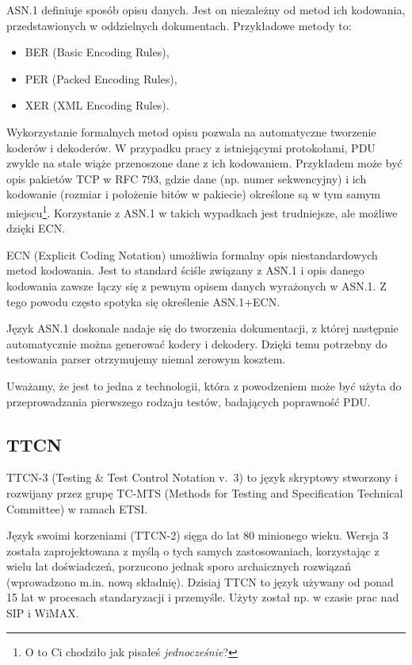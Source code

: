 \documentclass[00-praca-magisterska.tex]{subfiles}
\begin{document}
ASN.1 definiuje sposób opisu danych. Jest on niezależny od metod ich kodowania,
przedstawionych w oddzielnych dokumentach. Przykładowe metody to:
\begin{itemize}
\item BER (Basic Encoding Rules),
\item PER (Packed Encoding Rules),
\item XER (XML Encoding Rules).
\end{itemize}

Wykorzystanie formalnych metod opisu pozwala na automatyczne tworzenie koderów i
dekoderów. W przypadku pracy z istniejącymi protokołami, PDU zwykle na stałe
wiąże przenoszone dane z ich kodowaniem. Przykładem może być opis pakietów TCP w
RFC 793, gdzie dane (np. numer sekwencyjny) i ich kodowanie (rozmiar i położenie
bitów w pakiecie) określone są w tym samym miejscu\footnote{O to Ci chodziło jak
pisałeś \emph{jednocześnie}?}. Korzystanie z ASN.1 w takich wypadkach jest
trudniejsze, ale możliwe dzięki ECN.

ECN (Explicit Coding Notation) umożliwia formalny opis niestandardowych metod
kodowania. Jest to standard ściśle związany z ASN.1 i opis danego kodowania
zawsze łączy się z pewnym opisem danych wyrażonych w ASN.1. Z tego powodu często
spotyka się określenie ASN.1+ECN.


Język ASN.1 doskonale nadaje się do tworzenia dokumentacji, z której następnie
automatycznie można generować kodery i dekodery. Dzięki temu potrzebny do
testowania parser otrzymujemy niemal zerowym kosztem.

Uważamy, że jest to jedna z technologii, która z powodzeniem może być użyta do
przeprowadzania pierwszego rodzaju testów, badających poprawność PDU.

\subsection{TTCN}

TTCN-3 (Testing \& Test Control Notation v.~3) to język skryptowy stworzony i
rozwijany przez grupę TC-MTS (Methods for Testing and Specification Technical
Committee) w ramach ETSI.

Język swoimi korzeniami (TTCN-2) sięga do lat 80 minionego wieku. Wersja 3
została zaprojektowana z myślą o tych samych zastosowaniach, korzystając z wielu
lat doświadczeń, porzucono jednak sporo archaicznych rozwiązań (wprowadzono
m.in. nową składnię). Dzisiaj TTCN to język używany od ponad 15 lat w procesach
standaryzacji i przemyśle. Użyty został np. w czasie prac nad SIP i WiMAX.
\end{document}
